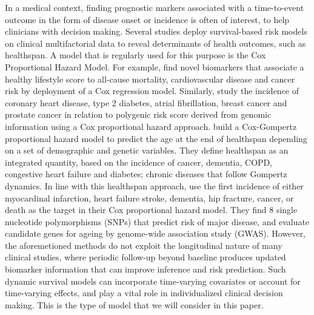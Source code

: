 In a medical context, finding prognostic markers associated with a time-to-event outcome in the form of disease onset or incidence is often of interest, to help clinicians with decision making. 
Several studies deploy survival-based risk models on clinical multifactorial data to reveal determinants of health outcomes, such as healthspan. A model that is regularly used for this purpose is the Cox Proportional Hazard Model. For example, \cite{bonaccio2019impact} find novel biomarkers that associate a healthy lifestyle score to all-cause mortality, cardiovascular disease and cancer risk by deployment of a Cox regression model. Similarly, \cite{mars2020polygenic} study the incidence of coronary heart disease, type 2 diabetes, atrial fibrillation, breast cancer and prostate cancer in relation to polygenic risk score derived from genomic information using a Cox proportional hazard approach. \cite{zenin2019identification} build a Cox-Gompertz proportional hazard model to predict the age at the end of healthspan depending on a set of demographic and genetic variables. They define healthspan as an integrated quantity, based on the incidence of cancer, dementia, COPD, congestive heart failure and diabetes; chronic diseases that follow Gompertz dynamics. In line with this healthspan approach, \cite{walter2011genome} use the first incidence of either myocardinal infarction, heart failure stroke, dementia, hip fracture, cancer, or death as the target in their Cox proportional hazard model. They find 8 single nucleotide polymorphisms (SNPs) that predict risk of major disease, and evaluate candidate genes for ageing by genome-wide association study (GWAS).  %
However, the aforemetioned methods do not exploit the longitudinal nature of many clinical studies, where periodic follow-up beyond baseline produces updated biomarker information that can improve inference and risk prediction. 
Such dynamic survival models can incorporate time-varying covariates or account for time-varying effects, and play a vital role in individualized clinical decision making. This is the type of model that we will consider in this paper. 
 
